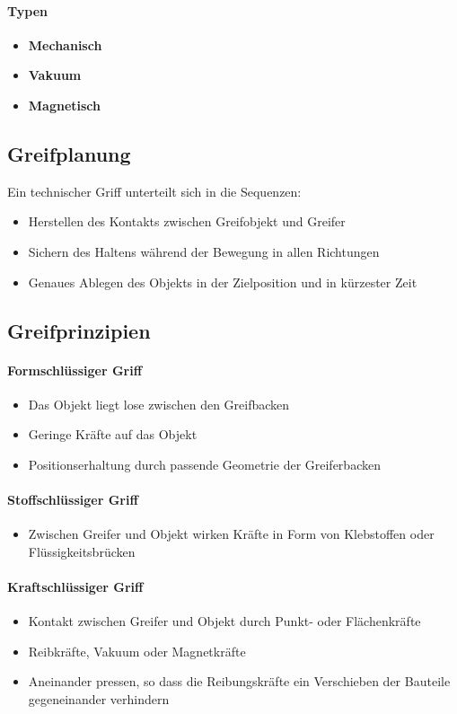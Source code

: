 \paragraph{Typen}
\begin{itemize}
	\item \textbf{Mechanisch}
	\item \textbf{Vakuum}
	\item \textbf{Magnetisch}
\end{itemize}
\subsection{Greifplanung}
Ein technischer Griff unterteilt sich in die Sequenzen:
\begin{itemize}
	\item Herstellen des Kontakts zwischen Greifobjekt und Greifer
	\item Sichern des Haltens während der Bewegung in allen Richtungen
	\item Genaues Ablegen des Objekts in der Zielposition und in kürzester Zeit
\end{itemize}
\subsection{Greifprinzipien}
\paragraph{Formschlüssiger Griff}
\begin{itemize}
	\item Das Objekt liegt lose zwischen den Greifbacken
	\item Geringe Kräfte auf das Objekt
	\item Positionserhaltung durch passende Geometrie der Greiferbacken
\end{itemize}
\paragraph{Stoffschlüssiger Griff}
\begin{itemize}
	\item Zwischen Greifer und Objekt wirken Kräfte in Form von Klebstoffen oder Flüssigkeitsbrücken
\end{itemize}
\paragraph{Kraftschlüssiger Griff}
\begin{itemize}
	\item Kontakt zwischen Greifer und Objekt durch Punkt- oder Flächenkräfte
	\item Reibkräfte, Vakuum oder Magnetkräfte
	\item Aneinander pressen, so dass die Reibungskräfte ein Verschieben der Bauteile gegeneinander verhindern
\end{itemize}
